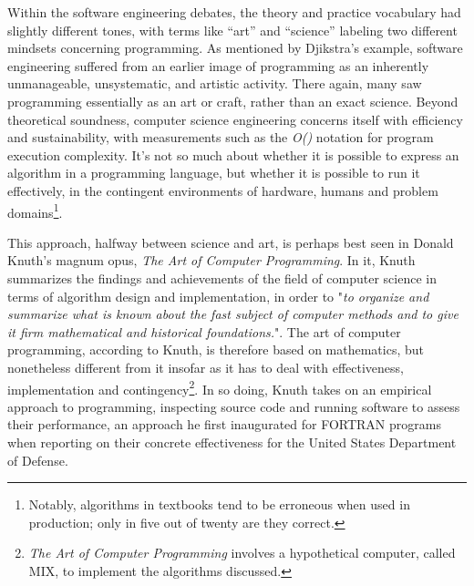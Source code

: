Within the software engineering debates, the theory and practice vocabulary had slightly different tones, with terms like “art” and “science” labeling two different mindsets concerning programming\cite{knuth_art_1997}. As mentioned by Djikstra's example, software engineering suffered from an earlier image of programming as an inherently unmanageable, unsystematic, and artistic activity. There again, many saw programming essentially as an art or craft\cite{tedre_development_2006}, rather than an exact science. Beyond theoretical soundness, computer science engineering concerns itself with efficiency and sustainability, with measurements such as the \emph{O()} notation for program execution complexity. It's not so much about whether it is possible to express an algorithm in a programming language, but whether it is possible to run it effectively, in the contingent environments of hardware, humans and problem domains\footnote{Notably, algorithms in textbooks tend to be erroneous when used in production; only in five out of twenty are they correct\cite{pattis_textbook_1988}.}.

This approach, halfway between science and art, is perhaps best seen in Donald Knuth's magnum opus, \emph{The Art of Computer Programming}. In it, Knuth summarizes the findings and achievements of the field of computer science in terms of algorithm design and implementation, in order to "\emph{to organize and summarize what is known about the fast subject of computer methods and to give it firm mathematical and historical foundations.}"\cite{knuth_art_1997}. The art of computer programming, according to Knuth, is therefore based on mathematics, but nonetheless different from it insofar as it has to deal with effectiveness, implementation and contingency\footnote{\emph{The Art of Computer Programming} involves a hypothetical computer, called MIX, to implement the algorithms discussed.}. In so doing, Knuth takes on an empirical approach to programming, inspecting source code and running software to assess their performance, an approach he first inaugurated for FORTRAN programs when reporting on their concrete effectiveness for the United States Department of Defense\cite{defensetechnicalinformationcenter_dtic_1970}.

